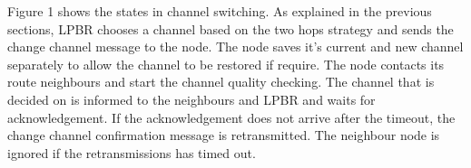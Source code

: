 Figure 1 shows the states in channel switching. As explained in the previous sections, LPBR chooses a channel based on the two hops strategy and sends the change channel message to the node. The node saves it's current and new channel separately to allow the channel to be restored if require. The node contacts its route neighbours and start the channel quality checking. The channel that is decided on is informed to the neighbours and LPBR and waits for acknowledgement. If the acknowledgement does not arrive after the timeout, the change channel confirmation message is retransmitted. The neighbour node is ignored if the retransmissions has timed out. 



